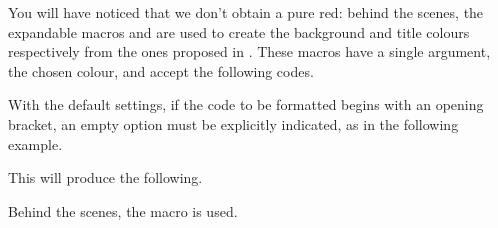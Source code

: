\documentclass[10pt, a4paper]{article}
\begin{document}
\begin{tdocnote}
    You will have noticed that we don't obtain a pure red: behind the scenes, the expandable macros  and  are used to create the background and title colours respectively from the ones proposed in .
    These macros have a single argument, the chosen colour, and accept the following codes.

    \begin{tdoclatex}[code]
    \end{tdoclatex}
\end{tdocnote}




\begin{tdocwarn}
    With the default settings, if the code to be formatted begins with an opening bracket, an empty option must be explicitly indicated, as in the following example.


    This will produce the following.

    \medskip

    
\end{tdocwarn}


\begin{tdocnote}
    Behind the scenes, the  macro is used.

    \begin{tdoclatex}[std]
    \end{tdoclatex}
\end{tdocnote}
\end{document}
